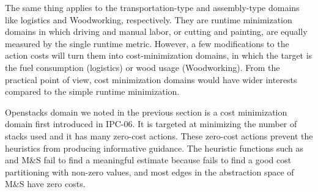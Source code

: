 The same thing applies to the transportation-type and assembly-type
domains like logistics and Woodworking, respectively. They are runtime
minimization domains in which driving and manual labor, or cutting and
painting, are equally measured by the single runtime metric.
% 
However, a few modifications to the action costs will turn them into
cost-minimization domains, in which the target is the fuel consumption
(logistics) or wood usage (Woodworking). From the practical point of
view, cost minimization domains would have wider interests compared to
the simple runtime minimization.

Openstacks domain we noted in the previous section is a cost
minimization domain first introduced in IPC-06. It is targeted at
minimizing the number of stacks used and it has many zero-cost
actions. These zero-cost actions prevent the heuristics from producing
informative guidance. The \sota heuristic functions such as \lmcut
\cite{Helmert2009} and M\&S \cite{helmert2007flexible} fail to find a
meaningful estimate because \lmcut fails to find a good cost
partitioning with non-zero values, and most edges in the abstraction
space of M\&S have zero costs.




